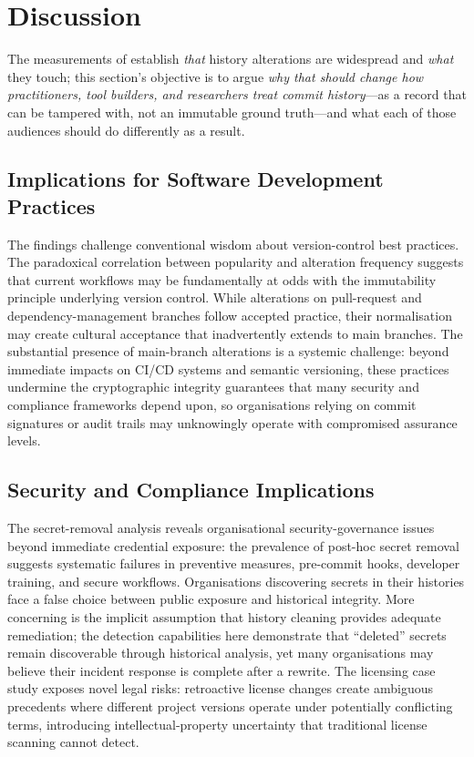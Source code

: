 \section{Discussion}
\label{sec:hist-discussion}

The measurements of  establish \emph{that} history alterations are widespread and \emph{what} they touch; this section's objective is to argue \emph{why that should change how practitioners, tool builders, and researchers treat commit history}---as a record that can be tampered with, not an immutable ground truth---and what each of those audiences should do differently as a result.

\subsection{Implications for Software Development Practices}
\label{subsec:hist-disc-audit-trail}

The findings challenge conventional wisdom about version-control best practices.
The paradoxical correlation between popularity and alteration frequency suggests that current workflows may be fundamentally at odds with the immutability principle underlying version control.
While alterations on pull-request and dependency-management branches follow accepted practice, their normalisation may create cultural acceptance that inadvertently extends to main branches.
The substantial presence of main-branch alterations is a systemic challenge: beyond immediate impacts on CI/CD systems and semantic versioning, these practices undermine the cryptographic integrity guarantees that many security and compliance frameworks depend upon, so organisations relying on commit signatures or audit trails may unknowingly operate with compromised assurance levels.

\subsection{Security and Compliance Implications}
\label{subsec:hist-disc-benign-concealment}

The secret-removal analysis reveals organisational security-governance issues beyond immediate credential exposure: the prevalence of post-hoc secret removal suggests systematic failures in preventive measures, pre-commit hooks, developer training, and secure workflows.
Organisations discovering secrets in their histories face a false choice between public exposure and historical integrity.
More concerning is the implicit assumption that history cleaning provides adequate remediation; the detection capabilities here demonstrate that ``deleted'' secrets remain discoverable through historical analysis, yet many organisations may believe their incident response is complete after a rewrite.
The licensing case study exposes novel legal risks: retroactive license changes create ambiguous precedents where different project versions operate under potentially conflicting terms, introducing intellectual-property uncertainty that traditional license scanning cannot detect.

